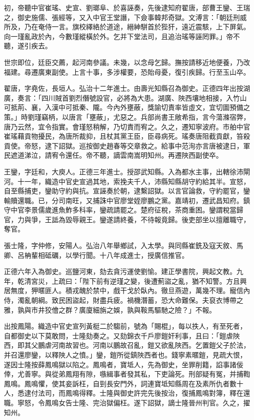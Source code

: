 \begin{pinyinscope}
初，帝聽中官崔瑤、史宣、劉瑯阜、於喜誣奏，先後逮知府翟唐，部曹王鑾、王瑞之，御史施儒、張經等，又入中官王堂譖，下僉事韓邦奇獄。文溥言：「朝廷刑威所及，乃在奄侍一言。旗校繹絡於道途，縉紳駢首於狴犴，遠近震駭，上下屏氣。向一瑾亂政於內，今數瑾縱橫於外。乞并下堂法司，且追治瑤等誣罔罪。」帝不聽，遂引疾去。

世宗即位，廷臣交薦，起河南參議。未幾，以念母乞歸。撫按請移近地便養，乃改福建。尋遷廣東副使。上言十事，多涉權要，恐貽母憂，復引疾歸。行至玉山卒。

翟唐，字堯佐，長垣人。弘治十二年進士。由壽光知縣召為御史。正德四年出按湖廣，奏言：「四川賊首劉烈僭號設官，必將為大患。湖廣、陜西壤地相接，入竹山可抵荊、襄，入漢中可抵秦、隴。今內外壅蔽，獎諭切責率皆虛文，宜切圖預備之策。」時劉瑾竊柄，以唐言「壅蔽」，尤惡之。兵部尚書王敞希指，言今蕩滌宿弊，唐乃云然，宜令指實。會瑾怒稍解，乃切責而宥之。久之，遷知寧波府。市舶中官崔瑤藉貢物擾民，為唐所裁抑，且杖其黨王臣，臣尋病死。瑤奏唐阻截貢獻，笞殺貢使。帝怒，逮下詔獄。巡按御史趙春等交章救之。給事中范洵亦言唐被逮日，軍民遮道涕泣，請宥令還任。帝不聽，謫雲南嵩明知州。再遷陜西副使卒。

王鑾，字廷和，大庾人。正德三年進士。授邵武知縣。入為都水主事，出轄徐沛閘河。十一年，織造中官史宣過其地，索挽夫千人，沛縣知縣胡守約給其半。宣怒，自至縣捕吏，鑾助守約與抗。宣誣奏於朝，逮繫詔獄。以言官論救，守約罷官，鑾輸贖還職。已，分司南旺，又捕誅中官廖堂姪廖鵬之黨。嘉靖初，遷武昌知府。鎮守中官李景儒歲進魚鮓多科率，鑾疏請罷之。楚府征稅，茶商重困。鑾謂稅當歸官，力與爭，王詆為毀辱親王。鑾遂請終養，不待報竟歸。後吏部坐以擅離職守，奪官。

張士隆，字仲修，安陽人。弘治八年舉鄉試，入太學。與同縣崔銑及寇天敘、馬卿、呂柟輩相砥礪，以學行聞。十八年成進士，授廣信推官。

正德六年入為御史。巡鹽河東，劾去貪污運使劉愉。建正學書院，興起文教。九年，乾清宮災，上疏曰：「陛下前有逆瑾之變，後遭薊盜之亂，猶不知警。方且興居無度，狎暱匪人。積戎醜於禁中，戲干戈於臥內。徹旦燕遊，萬幾不理。寵信內侍，濁亂朝綱。致民困盜起，財盡兵疲。禍機潛蓄，恐大命難保。夫裒衣博帶之雅，孰與市井狡儈之群？廣廈細旃之娛，孰與鞍馬驅馳之險？」不報。

出按鳳陽。織造中官史宣列黃梃二於騶前，號為「賜棍」，每以抶人，有至死者，自都御史以下莫敢問，士隆劾奏之。又劾錦衣千戶廖鎧奸利事，且曰：「鎧虐陜西，即其父鵬虐河南故習也。河南以鵬故召亂，鎧又欲亂陜西。乞置鎧父子於法，并召還廖鑾，以釋陜人之憤。」鑾，鎧所從鎮陜西者也。錢寧素暱鎧，見疏大恨，遂因士隆按薛鳳鳴獄以陷之。鳳鳴者，寶坻人，先為御史，坐罪削籍，諂事諸佞倖，尤善寧。與從弟鳳翔有隙，嗾緝事者發其私，下吏論死。刑部疑有冤，并捕鞫鳳鳴。鳳鳴懼，使其妾訴枉，自剄長安門外，詞連寶坻知縣周在及素所仇者數十人，悉逮付法司，而鳳鳴得釋。士隆與御史許完先後按治，復捕鳳鳴對簿，釋在還職。寧怒，令鳳鳴女告士隆、完治獄偏枉。遂下詔獄，謫士隆晉州判官。久之，擢知州。


\end{pinyinscope}

